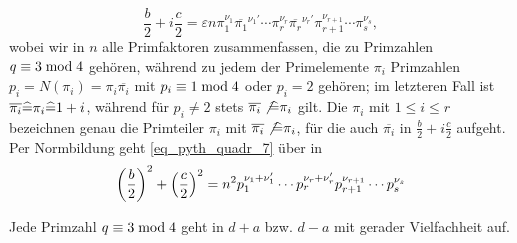 	\begin{equation}
		\frac{b}{2} + i \frac{c}{2} = \varepsilon n \pi_1^{\nu_1} \overline{\pi_1}^{\nu_1'} \cdots \pi_r^{\nu_r} \overline{\pi_r}^{\nu_r'} \pi_{r+1}^{\nu_{r+1}} \cdots \pi_s^{\nu_s}, \label{eq_pyth_quadr_7}
	\end{equation}
	wobei wir in $n$ alle Primfaktoren zusammenfassen, die zu Primzahlen $q \kon 3 \modu 4$ gehören, während zu jedem der Primelemente $\pi_i$ Primzahlen $p_i = N(\pi_i) = \pi_i \overline{\pi_i}$ mit $p_i \kon 1 \modu 4$ oder $p_i = 2$ gehören; im letzteren Fall ist $\overline{\pi_i} \assoz \pi_i \assoz 1+i$, während für $p_i \neq 2$ stets $\overline{\pi_i} \not\assoz \pi_i$ gilt. Die $\pi_i$ mit $1 \leq i \leq r$ bezeichnen genau die Primteiler $\pi_i$ mit $\overline{\pi_i} \not\assoz \pi_i$, für die auch $\overline{\pi_i}$ in $\frac{b}{2} + i \frac{c}{2}$ aufgeht. Per Normbildung geht \eqref{eq_pyth_quadr_7} über in
	\begin{equation}
		\enbrace*{\frac{b}{2}}^2 + \enbrace*{\frac{c}{2}}^2 = n^2 p_1^{\nu_1 + \nu_1'} \cdots p_r^{\nu_r + \nu_r'} p_{r+1}^{\nu_{r+1}} \cdots p_s^{\nu_s} \label{eq_pyth_quadr_8}
	\end{equation}

\begin{lemma}
	Jede Primzahl $q \kon 3 \modu 4$ geht in $d+a$ bzw. $d-a$ mit gerader Vielfachheit auf.
\end{lemma}

